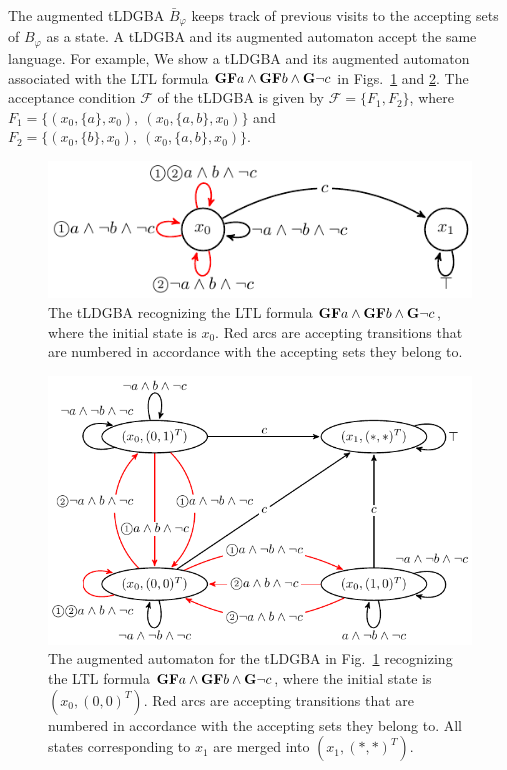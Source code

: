 \documentclass[letterpaper, 10 pt, conference]{ieeeconf}  %
\begin{document}
The augmented tLDGBA $\bar{B}_{\varphi}$ keeps track of previous visits to the accepting sets of $B_{\varphi}$ as a state. A tLDGBA and its augmented automaton accept the same language. For example, We show a tLDGBA and its augmented automaton associated with the LTL formula $\text{{\bf GF}}a \land \text{{\bf GF}}b \land \text{{\bf G}}\neg c$ in Figs.\ \ref{automaton} and \ref{automaton_aug}. The acceptance condition ${\mathcal F}$ of the tLDGBA is given by ${\mathcal F} = \{ F_1,F_2 \}$, where $F_1=\{ (x_0, \{ a \}, x_0),\ (x_0, \{ a,b \}, x_0) \}$ and $F_2 = \{ (x_0, \{ b \}, x_0),\ (x_0, \{ a,b \}, x_0) \}$.

\begin{figure}[htbp]
   \centering
   \vspace{2mm}
   \includegraphics[bb=0 0 247 80,scale=0.65]{ldgba_original.pdf}
   \caption{The tLDGBA recognizing the LTL formula $\text{{\bf GF}}a \wedge \text{{\bf GF}}b \wedge \text{{\bf G}}\neg c$, where the initial state is $x_0$. Red arcs are accepting transitions that are numbered in accordance with the accepting sets they belong to.}
   \label{automaton}
\end{figure}

\begin{figure}[htbp]
   \centering
   \includegraphics[bb=0 0 374 207,scale=0.6]{ldgba.pdf}
   \caption{The augmented automaton for the tLDGBA in Fig.~\ref{automaton} recognizing the LTL formula $\text{{\bf GF}}a \wedge \text{{\bf GF}}b \wedge \text{{\bf G}}\neg c$, where the initial state is $(x_0, (0,0)^T )$. Red arcs are accepting transitions that are numbered in accordance with the accepting sets they belong to. All states corresponding to $x_1$ are merged into $(x_1, (*,*)^T )$.}
   \label{automaton_aug}
\end{figure}
\end{document}
